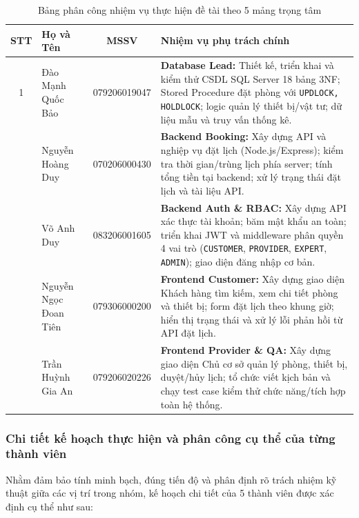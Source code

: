 \begin{table}[H]
\centering
\small
\caption{Bảng phân công nhiệm vụ thực hiện đề tài theo 5 mảng trọng tâm}
\label{tab:member_tasks}
\begin{tabularx}{\textwidth}{c l c X}
\toprule
\textbf{STT} & \textbf{Họ và Tên} & \textbf{MSSV} & \textbf{Nhiệm vụ phụ trách chính} \\
\midrule
1 & Đào Mạnh Quốc Bảo & 079206019047 & \textbf{Database Lead:} Thiết kế, triển khai và kiểm thử CSDL SQL Server 18 bảng 3NF; Stored Procedure đặt phòng với \texttt{UPDLOCK, HOLDLOCK}; logic quản lý thiết bị/vật tư; dữ liệu mẫu và truy vấn thống kê. \\
\addlinespace
2 & Nguyễn Hoàng Duy & 070206000430 & \textbf{Backend Booking:} Xây dựng API và nghiệp vụ đặt lịch (Node.js/Express); kiểm tra thời gian/trùng lịch phía server; tính tổng tiền tại backend; xử lý trạng thái đặt lịch và tài liệu API. \\
\addlinespace
3 & Võ Anh Duy & 083206001605 & \textbf{Backend Auth \& RBAC:} Xây dựng API xác thực tài khoản; băm mật khẩu an toàn; triển khai JWT và middleware phân quyền 4 vai trò (\texttt{CUSTOMER}, \texttt{PROVIDER}, \texttt{EXPERT}, \texttt{ADMIN}); giao diện đăng nhập cơ bản. \\
\addlinespace
4 & Nguyễn Ngọc Đoan Tiên & 079306000200 & \textbf{Frontend Customer:} Xây dựng giao diện Khách hàng tìm kiếm, xem chi tiết phòng và thiết bị; form đặt lịch theo khung giờ; hiển thị trạng thái và xử lý lỗi phản hồi từ API đặt lịch. \\
\addlinespace
5 & Trần Huỳnh Gia An & 079206020226 & \textbf{Frontend Provider \& QA:} Xây dựng giao diện Chủ cơ sở quản lý phòng, thiết bị, duyệt/hủy lịch; tổ chức viết kịch bản và chạy test case kiểm thử chức năng/tích hợp toàn hệ thống. \\
\bottomrule
\end{tabularx}
\end{table}

\subsubsection{Chi tiết kế hoạch thực hiện và phân công cụ thể của từng thành viên}

Nhằm đảm bảo tính minh bạch, đúng tiến độ và phân định rõ trách nhiệm kỹ thuật giữa các vị trí trong nhóm, kế hoạch chi tiết của 5 thành viên được xác định cụ thể như sau:

